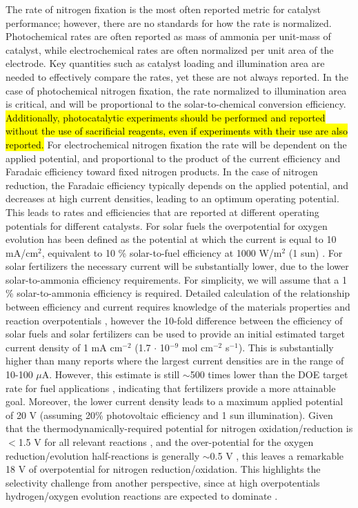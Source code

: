 The rate of nitrogen fixation is the most often reported metric for catalyst performance; however, there are no standards for how the rate is normalized. Photochemical rates are often reported as mass of ammonia per unit-mass of catalyst, while electrochemical rates are often normalized per unit area of the electrode. Key quantities such as catalyst loading and illumination area are needed to effectively compare the rates, yet these are not always reported. In the case of photochemical nitrogen fixation, the rate normalized to illumination area is critical, and will be proportional to the solar-to-chemical conversion efficiency. \hl{Additionally, photocatalytic experiments should be performed and reported without the use of sacrificial reagents, even if experiments with their use are also reported.} For electrochemical nitrogen fixation the rate will be dependent on the applied potential, and proportional to the product of the current efficiency and Faradaic efficiency toward fixed nitrogen products. In the case of nitrogen reduction, the Faradaic efficiency typically depends on the applied potential, and decreases at high current densities, leading to an optimum operating potential. This leads to rates and efficiencies that are reported at different operating potentials for different catalysts. For solar fuels the overpotential for oxygen evolution has been defined as the potential at which the current is equal to 10 mA/cm$^2$, equivalent to 10 \% solar-to-fuel efficiency at 1000 W/m$^2$ (1 sun) \cite{McCrory_2013}. For solar fertilizers the necessary current will be substantially lower, due to the lower solar-to-ammonia efficiency requirements. 
For simplicity, we will assume that a 1 \% solar-to-ammonia efficiency is required. Detailed calculation of the relationship between efficiency and current requires knowledge of the materials properties and reaction overpotentials \cite{Weber_1984,Pinaud_2013,Seitz_2014}, however the 10-fold difference between the efficiency of solar fuels and solar fertilizers can be used to provide an initial estimated target current density of 1 mA cm$^{-2}$ (1.7 $\cdot$ 10$^{-9}$ mol cm$^{-2}$ s$^{-1}$). 
This is substantially higher than many reports where the largest current densities are in the range of 10-100 $\mu$A. However, this estimate is still $\sim$500 times lower than the DOE target rate for fuel applications \cite{McPherson_2019}, indicating that fertilizers provide a more attainable goal. Moreover, the lower current density leads to a maximum applied potential of 20 V (assuming 20\% photovoltaic efficiency and 1 sun illumination). Given that the thermodynamically-required potential for nitrogen oxidation/reduction is $<$1.5 V for all relevant reactions \cite{Medford_2017}, and the over-potential for the oxygen reduction/evolution half-reactions is generally $\sim$0.5 V \cite{McCrory_2013,McCrory_2015}, this leaves a remarkable 18 V of overpotential for nitrogen reduction/oxidation. This highlights the selectivity challenge from another perspective, since at high overpotentials hydrogen/oxygen evolution reactions are expected to dominate \cite{Skulason_2012, Singh_2017}.

